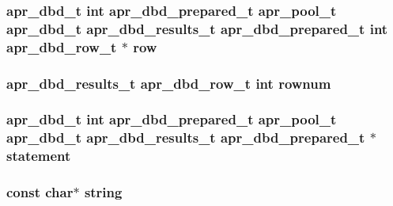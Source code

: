 \subsubsection[{\texorpdfstring{row}{row}}]{ {\bf apr\+\_\+dbd\+\_\+t} {\bf int} {\bf apr\+\_\+dbd\+\_\+prepared\+\_\+t} {\bf apr\+\_\+pool\+\_\+t} {\bf apr\+\_\+dbd\+\_\+t} {\bf apr\+\_\+dbd\+\_\+results\+\_\+t} {\bf apr\+\_\+dbd\+\_\+prepared\+\_\+t} {\bf int} {\bf apr\+\_\+dbd\+\_\+row\+\_\+t} $\ast$ row}\hypertarget{group__APR__Util__DBD_ga98834f9ea71a411bba8858886c6454ed}{}\label{group__APR__Util__DBD_ga98834f9ea71a411bba8858886c6454ed}
\subsubsection[{\texorpdfstring{rownum}{rownum}}]{ {\bf apr\+\_\+dbd\+\_\+results\+\_\+t} {\bf apr\+\_\+dbd\+\_\+row\+\_\+t} {\bf int} rownum}\hypertarget{group__APR__Util__DBD_ga75c9df9c4ef67392d3f04dd674382bce}{}\label{group__APR__Util__DBD_ga75c9df9c4ef67392d3f04dd674382bce}
\subsubsection[{\texorpdfstring{statement}{statement}}]{ {\bf apr\+\_\+dbd\+\_\+t} {\bf int} {\bf apr\+\_\+dbd\+\_\+prepared\+\_\+t} {\bf apr\+\_\+pool\+\_\+t} {\bf apr\+\_\+dbd\+\_\+t} {\bf apr\+\_\+dbd\+\_\+results\+\_\+t} {\bf apr\+\_\+dbd\+\_\+prepared\+\_\+t} $\ast$ statement}\hypertarget{group__APR__Util__DBD_ga4e2545dd013163aa26d4aa994db42fb6}{}\label{group__APR__Util__DBD_ga4e2545dd013163aa26d4aa994db42fb6}
\subsubsection[{\texorpdfstring{string}{string}}]{ const char$\ast$ string}\hypertarget{group__APR__Util__DBD_ga7793f069712367d96ac8021492fba941}{}\label{group__APR__Util__DBD_ga7793f069712367d96ac8021492fba941}
